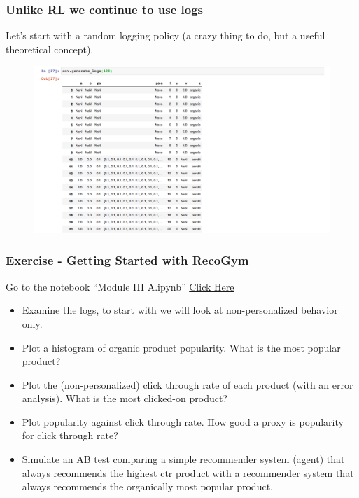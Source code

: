    \begin{frame}
    \frametitle{Unlike RL we continue to use logs}
   
    Let's start with a random logging policy (a crazy thing to do, but a useful theoretical concept).
    
     \begin{figure}[h!]
       \includegraphics[scale=0.3]{images/recogymlog.png}
         \centering
         \label{motex1}
     \end{figure}
  \end{frame}


  \begin{frame}
    \frametitle{Exercise - Getting Started with RecoGym}

    Go to the notebook ``Module III A.ipynb'' \href{https://colab.research.google.com/github/criteo-research/reco-gym/blob/DS3/Module\%20III\%20A.ipynb}{Click Here}

\begin{itemize}
  \item Examine the logs, to start with we will look at non-personalized behavior only.
  \item Plot a histogram of organic product popularity. What is the most popular product?  
  \item Plot the (non-personalized) click through rate of each product (with an error analysis).  What is the most clicked-on product?
  \item Plot popularity against click through rate.  How good a proxy is popularity for click through rate?
  \item Simulate an AB test comparing a simple recommender system (agent) that always recommends the highest ctr product with a recommender system that always recommends the organically most popular product.
\end{itemize}

\end{frame}

